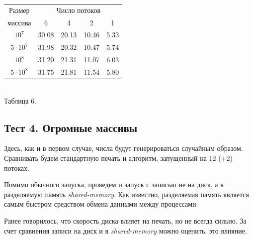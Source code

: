 \begin{center}
\begin{tabular}{||c|c|c|c|c||}
\hline
\hline
Размер & \multicolumn{4}{c|}{Число потоков}\\
\hhline{~|-|-|-|-|}
массива & 6 & 4 & 2& 1 \\
\hline
$10^7$  & 30.08 & 20.13 & 10.46 & 5.33 \\
\hline
$5 \cdot 10^7$ & 31.98 & 20.32 & 10.47 & 5.74 \\
\hline
$10^8$ & 31.20 & 21.31 & 11.07 & 6.03 \\
\hline
$5 \cdot 10^8$ & 31.75 & 21.81 & 11.54 & 5.80 \\
\hline
\hline
\end{tabular}
\\
\vspace{14pt}
\small{Таблица 6.}
\end{center}

\subsection{Тест 4. Огромные массивы} \label{subsec2:3}
Здесь, как и в первом случае, числа будут генерироваться случайным образом.
Сравнивать будем стандартную печать и алгоритм, запущенный на 12 (+2) потоках.

Помимо обычного запуска, проведем и запуск с записью не на диск, а в разделяемую память \textit{shared-memory}.
Как известно, разделяемая память является самым быстром средством обмена данными между процессами.

Ранее говорилось, что скорость диска влияет на печать, но не всегда сильно.
За счет сравнения записи на диск и в \textit{shared-memory} можно оценить, это влияние.

